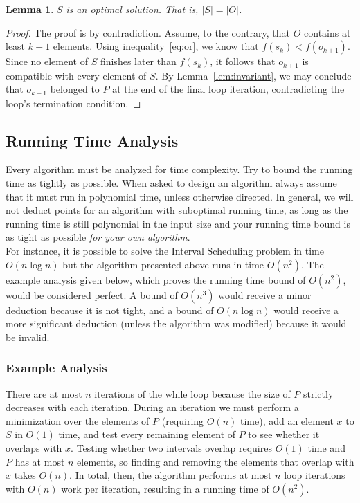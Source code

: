 \documentclass[12pt]{article}
\newtheorem{lemma}[theorem]{Lemma}
\begin{document}
\begin{lemma} \label{lem:opt}
$S$ is an optimal solution. That is, $|S|  = |O|$.
\end{lemma}

\begin{proof}
The proof is by contradiction. Assume, to the contrary, that $O$ contains
at least $k+1$ elements. Using inequality~\eqref{eq:or}, 
we know that $f(s_k) < f(o_{k+1})$. Since no element of $S$ 
finishes later than $f(s_k)$, it follows that $o_{k+1}$ is 
compatible with every element of $S$. By Lemma~\ref{lem:invariant},
we may conclude that $o_{k+1}$ belonged to $P$ at the end of the
final loop iteration, contradicting the loop's termination condition.
\end{proof}

\subsection{Running Time Analysis}
Every algorithm must be analyzed for time complexity. Try to bound the running time as tightly as possible. When asked to design an algorithm always assume that it must run in polynomial time, unless otherwise directed. In general, we will not deduct points for an algorithm with suboptimal running time, as long as the running time is still polynomial in the input size and your running time bound is as tight as possible {\em for your own algorithm}.\\

For instance, it is possible to solve the Interval Scheduling problem in time $O(n \log n)$ but the algorithm presented above runs in time $O(n^2)$. The example analysis given below, which proves the running time bound of $O(n^2)$, would be considered perfect. A bound of $O(n^3)$ would receive a minor deduction because it is not tight, and a bound of $O(n \log n)$ would receive a more significant deduction (unless the algorithm was modified) because it would be invalid.

\subsubsection{Example Analysis}
There are at most $n$ iterations of the while loop because the size of $P$ 
strictly decreases with each iteration. During an iteration we must perform
a minimization over the elements of $P$ (requiring $O(n)$ time), add an
element $x$ to $S$ in $O(1)$ time, and test every remaining element of $P$
to see whether it overlaps with $x$. Testing whether two intervals overlap
requires $O(1)$ time and $P$ has at most $n$ elements, so finding and
removing the elements
that overlap with $x$ takes $O(n)$. In total, then, the algorithm performs
at most $n$ loop iterations with $O(n)$ work per iteration, resulting in 
a running time of $O(n^2)$.
\end{document}
